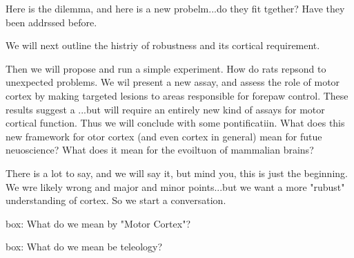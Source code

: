 Here is the dilemma, and here is a new probelm...do they fit tgether? Have they been addrssed before. 

We will next outline the histriy of robustness and its cortical requirement. 

Then we will propose and run a simple experiment. How do rats repsond to unexpected problems. We wil present a new assay, and assess the role of motor cortex by making targeted lesions to areas responsible for forepaw control. These results suggest a ...but will require an entirely new kind of assays for motor cortical function. Thus we will conclude with some pontificatiin. What does this new framework for otor cortex (and even cortex in general) mean for futue neuoscience? What does it mean for the evoiltuon of mammalian brains?

There is a lot to say, and we will say it, but mind you, this is just the beginning. We wre likely wrong and major and minor points...but we want a more "rubust" understanding of cortex. So we start a conversation.



box: What do we mean by "Motor Cortex"?



box: What do we mean be teleology?

